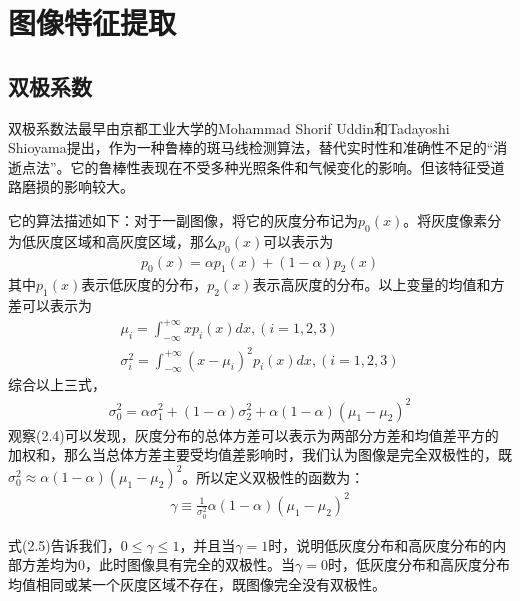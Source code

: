 \chapter{图像特征提取}
\label{cha:feature}

\section{双极系数}
\label{sec:bipolar}
双极系数法最早由京都工业大学的Mohammad Shorif Uddin和Tadayoshi Shioyama提出，作为一种鲁棒的斑马线检测算法，替代实时性和准确性不足的“消逝点法”。它的鲁棒性表现在不受多种光照条件和气候变化的影响。但该特征受道路磨损的影响较大。 \par
它的算法描述如下：对于一副图像，将它的灰度分布记为$p_0(x)$。将灰度像素分为低灰度区域和高灰度区域，那么$p_0(x)$可以表示为
\begin{align}
	p_0(x)=\alpha p_1(x) + (1-\alpha)p_2(x)
\end{align}
其中$p_1(x)$表示低灰度的分布，$p_2(x)$表示高灰度的分布。以上变量的均值和方差可以表示为
\begin{align}
	\mu_i=\int_{-\infty}^{+\infty}xp_i(x)dx, (i = 1, 2, 3) \\
	\sigma_i^2=\int_{-\infty}^{+\infty}(x-\mu_i)^2p_i(x)dx, (i = 1, 2, 3)
\end{align}
综合以上三式，
\begin{align}
	\sigma_0^2=\alpha \sigma_1^2+(1-\alpha)\sigma_2^2+\alpha(1-\alpha)(\mu_1-\mu_2)^2
\end{align}
观察(2.4)可以发现，灰度分布的总体方差可以表示为两部分方差和均值差平方的加权和，那么当总体方差主要受均值差影响时，我们认为图像是完全双极性的，既$\sigma_0^2\approx \alpha(1-\alpha)(\mu_1-\mu_2)^2$。所以定义双极性的函数为：
\begin{align}
	\gamma \equiv \frac{1}{\sigma_0^2} \alpha(1-\alpha)(\mu_1-\mu_2)^2 
\end{align}\par
式(2.5)告诉我们，$0 \leq \gamma \leq 1$，并且当$\gamma=1$时，说明低灰度分布和高灰度分布的内部方差均为0，此时图像具有完全的双极性。当$\gamma=0$时，低灰度分布和高灰度分布均值相同或某一个灰度区域不存在，既图像完全没有双极性。

